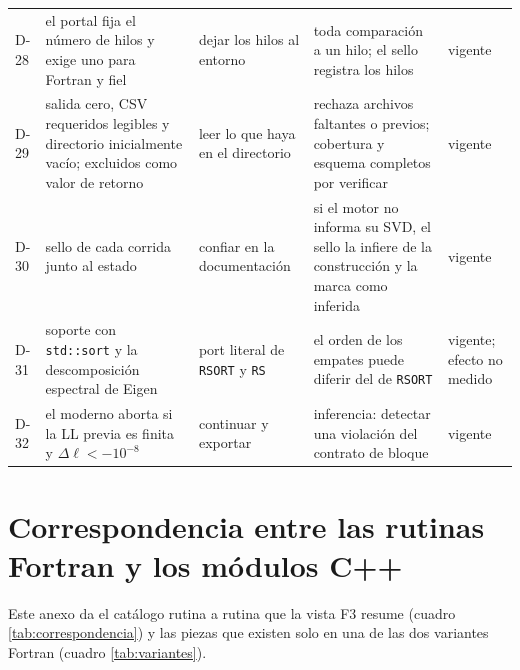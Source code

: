 \begin{longtable}{L{0.8cm}L{3.5cm}L{2.7cm}L{3.2cm}L{1.85cm}}
D-28 & el portal fija el número de hilos y exige uno para Fortran y fiel & dejar los hilos al
entorno & toda comparación a un hilo; el sello registra los hilos & vigente \\
D-29 & salida cero, CSV requeridos legibles y directorio inicialmente vacío;
excluidos como valor de retorno & leer lo que haya en el directorio & rechaza archivos
faltantes o previos; cobertura y esquema completos por verificar & vigente \\
D-30 & sello de cada corrida junto al estado & confiar en la documentación & si el motor no
informa su SVD, el sello la infiere de la construcción y la marca como inferida & vigente \\
D-31 & soporte con \texttt{std::sort} y la descomposición espectral de Eigen & port literal de
\texttt{RSORT} y \texttt{RS} & el orden de los empates puede diferir del de \texttt{RSORT} &
vigente; efecto no medido \\
D-32 & el moderno aborta si la LL previa es finita y $\Delta\ell<-10^{-8}$ & continuar y
exportar & inferencia: detectar una violación del contrato de bloque & vigente \\
\end{longtable}
\normalsize

\chapter[Correspondencia entre las rutinas Fortran y los módulos C++][Correspondencia Fortran y C++]{Correspondencia entre las rutinas Fortran y los módulos C++}
\label{anexo:correspondencia}

Este anexo da el catálogo rutina a rutina que la vista F3 resume (cuadro
\ref{tab:correspondencia}) y las piezas que existen solo en una de las dos variantes Fortran
(cuadro \ref{tab:variantes}).

